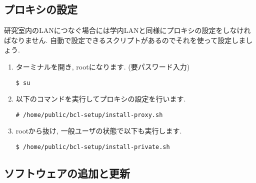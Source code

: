\documentclass{jarticle}
\begin{document}
\subsection{プロキシの設定}
研究室内のLANにつなぐ場合には学内LANと同様にプロキシの設定をしなければなりません.
自動で設定できるスクリプトがあるのでそれを使って設定しましょう.

\begin{enumerate}
  \item ターミナルを開き, rootになります. (要パスワード入力)
\begin{verbatim}
$ su
\end{verbatim}
  \item 以下のコマンドを実行してプロキシの設定を行います.
\begin{verbatim}
# /home/public/bcl-setup/install-proxy.sh
\end{verbatim}
  \item rootから抜け, 一般ユーザの状態で以下も実行します.
\begin{verbatim}
$ /home/public/bcl-setup/install-private.sh
\end{verbatim}
\end{enumerate}

\subsection{ソフトウェアの追加と更新}
\end{document}
